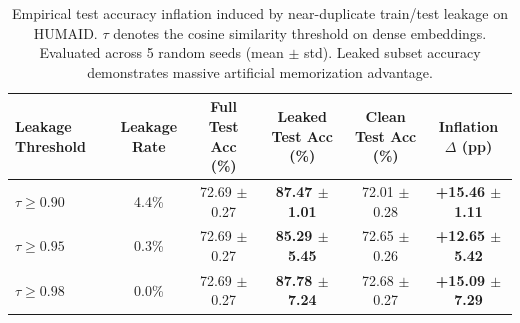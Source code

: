 \begin{table}[t]
\centering
\caption{Empirical test accuracy inflation induced by near-duplicate train/test leakage on HUMAID. $\tau$ denotes the cosine similarity threshold on dense embeddings. Evaluated across 5 random seeds (mean $\pm$ std). Leaked subset accuracy demonstrates massive artificial memorization advantage.}
\label{tab:leakage_impact_humaid}
\begin{tabular}{lccccc}
\toprule
\textbf{Leakage Threshold} & \textbf{Leakage Rate} & \textbf{Full Test Acc (\%)} & \textbf{Leaked Test Acc (\%)} & \textbf{Clean Test Acc (\%)} & \textbf{Inflation $\Delta$ (pp)} \\
\midrule
$\tau \ge 0.90$ & 4.4\% & 72.69 $\pm$ 0.27 & \textbf{87.47 $\pm$ 1.01} & 72.01 $\pm$ 0.28 & \textbf{+15.46 $\pm$ 1.11} \\
$\tau \ge 0.95$ & 0.3\% & 72.69 $\pm$ 0.27 & \textbf{85.29 $\pm$ 5.45} & 72.65 $\pm$ 0.26 & \textbf{+12.65 $\pm$ 5.42} \\
$\tau \ge 0.98$ & 0.0\% & 72.69 $\pm$ 0.27 & \textbf{87.78 $\pm$ 7.24} & 72.68 $\pm$ 0.27 & \textbf{+15.09 $\pm$ 7.29} \\
\bottomrule
\end{tabular}
\end{table}
